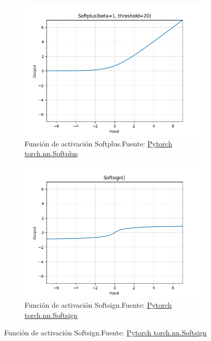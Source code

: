 \begin{figure}[H]
    \medskip %
    \begin{subfigure}{.475\linewidth}
        \centering
        \includegraphics[width=0.75\linewidth]{figures/equations/Softplus.png}
        \caption{Función de activación Softplus.\newline{}Fuente: \href{https://pytorch.org/docs/stable/generated/torch.nn.Softplus.html}{Pytorch torch.nn.Softplus}}
        \label{subfig:torch.nn.Softplus}
    \end{subfigure}\hfill %
    \begin{subfigure}{.475\linewidth}
        \centering
        \includegraphics[width=0.75\linewidth]{figures/equations/Softsign.png}
        \caption{Función de activación Softsign.\newline{}Fuente: \href{https://pytorch.org/docs/stable/generated/torch.nn.Softsign.html}{Pytorch torch.nn.Softsign}}
        \label{subfig:torch.nn.Softsign}
    \end{subfigure}


\end{figure}
